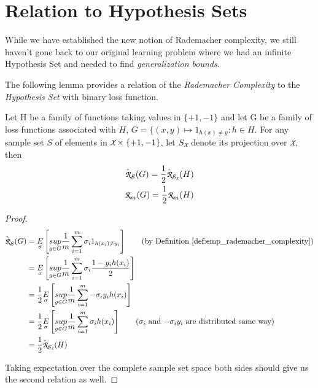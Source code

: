 \documentclass[../main]{subfiles}
\begin{document}
\section{Relation to Hypothesis Sets}

While we have established the new notion of Rademacher complexity, we still haven't
gone back to our original learning problem where we had an infinite Hypothesis Set
and needed to find \textit{generalization bounds}.

The following lemma provides a relation of the \textit{Rademacher Complexity} to the
\textit{Hypothesis Set} with binary loss function.

\begin{lemma} \label{lem:rademacher_hyposets}
Let H be a family of functions taking values in $\{+1,-1\}$ and let G be a family of loss
functions associated with $H$, $G = \{(x,y) \mapsto 1_{h(x)\neq y} : h \in H$. For any
sample set $S$ of elements in $\cursive{X} \times \{+1,-1\}$, let $S_{\cursive{X}}$ denote
its projection over $\cursive{X}$, then
\begin{align}
\hat{\cursive{R}}_S(G) = \frac{1}{2}\hat{\cursive{R}}_{S_{\cursive{X}}}(H)\\
\cursive{R}_m(G) = \frac{1}{2}\cursive{R}_m(H)
\end{align}
\end{lemma}
\begin{proof}
\begin{align}
\hat{\cursive{R}}_S(G) &= \underset{\sigma}{E}\left[ \underset{g \in G}{sup} \frac{1}{m} \sum_{i=1}^{m} \sigma_i 1_{h(x_i)\neq y_i} \right] \tag{by Definition \ref{def:emp_rademacher_complexity}} \\
&= \underset{\sigma}{E}\left[ \underset{g \in G}{sup} \frac{1}{m} \sum_{i=1}^{m} \sigma_i \frac{1 - y_ih(x_i)}{2} \right] \nonumber \\
&= \frac{1}{2} \underset{\sigma}{E}\left[ \underset{g \in G}{sup} \frac{1}{m} \sum_{i=1}^{m} -\sigma_i y_ih(x_i) \right] \nonumber \\
&= \frac{1}{2} \underset{\sigma}{E}\left[ \underset{g \in G}{sup} \frac{1}{m} \sum_{i=1}^{m} \sigma_i h(x_i) \right] \tag{$\sigma_i$ and $-\sigma_iy_i$ are distributed same way} \\
&= \frac{1}{2} \hat{\cursive{R}}_{S_{\cursive{X}}}(H)
\end{align}

Taking expectation over the complete sample set space both sides should give us the
second relation as well.
\end{proof}
\end{document}
